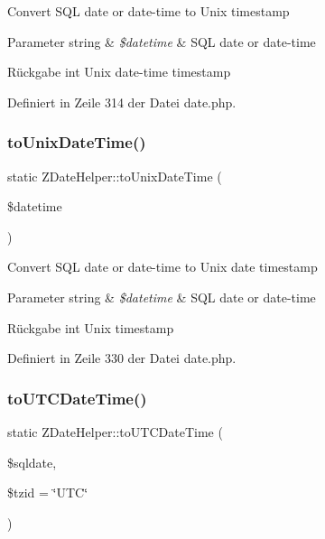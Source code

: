 Convert S\+QL date or date-\/time to Unix timestamp


\begin{DoxyParams}[1]{Parameter}
string & {\em \$datetime} & S\+QL date or date-\/time\\
\hline
\end{DoxyParams}
\begin{DoxyReturn}{Rückgabe}
int Unix date-\/time timestamp 
\end{DoxyReturn}


Definiert in Zeile 314 der Datei date.\+php.

\mbox{\label{class_z_date_helper_a99a5d6dacb113f1b30aa8c74439402f7}} 
\subsubsection{\texorpdfstring{to\+Unix\+Date\+Time()}{toUnixDateTime()}}
{\footnotesize\ttfamily static Z\+Date\+Helper\+::to\+Unix\+Date\+Time (\begin{DoxyParamCaption}\item[{}]{\$datetime }\end{DoxyParamCaption})\hspace{0.3cm}{\ttfamily [static]}}

Convert S\+QL date or date-\/time to Unix date timestamp


\begin{DoxyParams}[1]{Parameter}
string & {\em \$datetime} & S\+QL date or date-\/time\\
\hline
\end{DoxyParams}
\begin{DoxyReturn}{Rückgabe}
int Unix timestamp 
\end{DoxyReturn}


Definiert in Zeile 330 der Datei date.\+php.

\mbox{\label{class_z_date_helper_ae48ebb7e1e9ed5de7c0d3254be081ffb}} 
\subsubsection{\texorpdfstring{to\+U\+T\+C\+Date\+Time()}{toUTCDateTime()}}
{\footnotesize\ttfamily static Z\+Date\+Helper\+::to\+U\+T\+C\+Date\+Time (\begin{DoxyParamCaption}\item[{}]{\$sqldate,  }\item[{}]{\$tzid = {\ttfamily \char`\"{}UTC\char`\"{}} }\end{DoxyParamCaption})\hspace{0.3cm}{\ttfamily [static]}}

